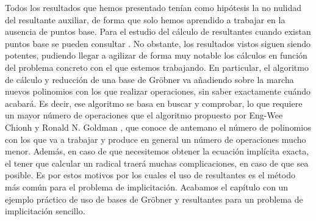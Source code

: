 Todos los resultados que hemos presentado tenían como hipótesis la no nulidad del resultante auxiliar, de forma que solo hemos aprendido a trabajar en la ausencia de puntos base. Para el estudio del cálculo de resultantes cuando existan puntos base se pueden consultar \cite{base1, base2}. No obstante, los resultados vistos siguen siendo potentes, pudiendo llegar a agilizar de forma muy notable los cálculos en función del problema concreto con el que estemos trabajando. En particular, el algoritmo de cálculo y reducción de una base de Gröbner va añadiendo sobre la marcha nuevos polinomios con los que realizar operaciones, sin saber exactamente cuándo acabará. Es decir, ese algoritmo se basa en buscar y comprobar, lo que requiere un mayor número de operaciones que el algoritmo propuesto por Eng-Wee Chionh y Ronald N. Goldman \cite{res1}, que conoce de antemano el número de polinomios con los que va a trabajar y produce en general un número de operaciones mucho menor. Además, en caso de que necesitemos obtener la ecuación implícita exacta, el tener que calcular un radical traerá muchas complicaciones, en caso de que sea posible. Es por estos motivos por los cuales el uso de resultantes es el método más común para el problema de implicitación. Acabamos el capítulo con un ejemplo práctico de uso de bases de Gröbner y resultantes para un problema de implicitación sencillo.
